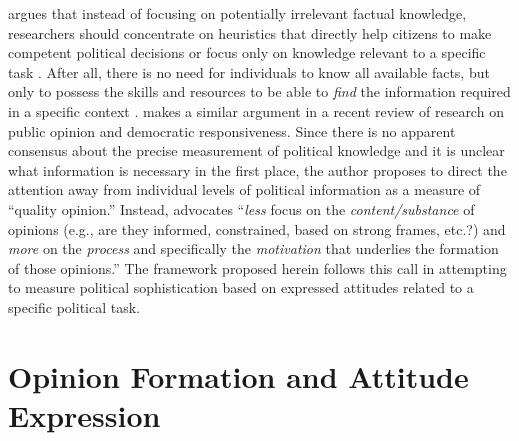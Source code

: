 \documentclass[12pt]{article}
\begin{document}
\citet{lupia2006elitism} argues that instead of focusing on potentially irrelevant factual knowledge, researchers should concentrate on heuristics that directly help citizens to make competent political decisions or focus only on knowledge relevant to a specific task \citep[see also][]{lupia1994shortcuts,lupia2015uninformed}. After all, there is no need for individuals to know all available facts, but only to possess the skills and resources to be able to \textit{find} the information required in a specific context \citep{prior2008money}. \citet{druckman2014pathologies} makes a similar argument in a recent review of research on public opinion and democratic responsiveness. Since there is no apparent consensus about the precise measurement of political knowledge and it is unclear what information is necessary in the first place, the author proposes to direct the attention away from individual levels of political information as a measure of ``quality opinion.'' Instead, \citet[478, emphasis in the original]{druckman2014pathologies} advocates ``\textit{less} focus on the \textit{content/substance} of opinions (e.g., are they informed, constrained, based on strong frames, etc.?) and \textit{more} on the \textit{process} and specifically the \textit{motivation} that underlies the formation of those opinions.'' The framework proposed herein follows this call in attempting to measure political sophistication based on expressed attitudes related to a specific political task.



\section*{Opinion Formation and Attitude Expression}

\end{document}
